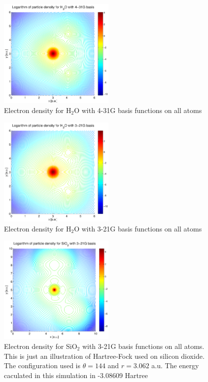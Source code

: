 \documentclass[a4paper,10pt, twocolumn, pre]{revtex4}
\begin{document}
\begin{figure}[h!tb]
\includegraphics[width=0.5\textwidth]{./figures/H2Odensity_431g.pdf}
\caption{Electron density for H$_2$O with 4-31G basis functions on all atoms}
\end{figure}
\begin{figure}[h!tb]
\includegraphics[width=0.5\textwidth]{./figures/H2Odensity_321g.pdf}
\caption{Electron density for H$_2$O with 3-21G basis functions on all atoms}
\end{figure}

\begin{figure}[h!tb]
\includegraphics[width=0.5\textwidth]{./figures/SiO2density_321g.pdf}
\caption{Electron density for SiO$_2$ with 3-21G basis functions on all atoms. This is just an illustration of Hartree-Fock used on silicon dioxide. The configuration used is $\theta=144$ and $r = 3.062$ a.u. The energy caculated in this simulation in -3.08609 Hartree}
\end{figure}
\end{document}
